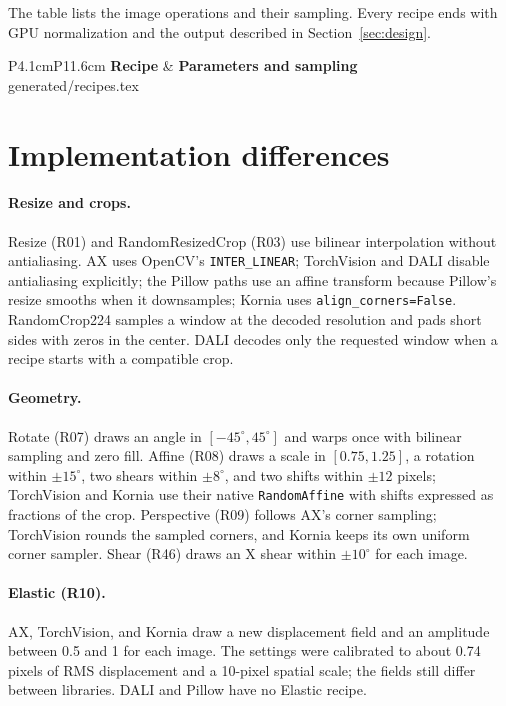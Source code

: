 \documentclass[11pt]{article}
\makeatletter
\let\inputrows\@@input
\makeatother
\begin{document}
The table lists the image operations and their sampling. Every recipe ends with GPU normalization
and the output described in Section~\ref{sec:design}.

\begingroup\small
{}
\begin{longtable}{P{4.1cm}P{11.6cm}}
\textbf{Recipe} & \textbf{Parameters and sampling} \\ \midrule\endhead
\inputrows generated/recipes.tex
\bottomrule
\end{longtable}
\endgroup

\section{Implementation differences}
\label{app:semantics}

\paragraph{Resize and crops.} Resize (R01) and RandomResizedCrop (R03) use bilinear interpolation
without antialiasing. AX uses OpenCV's \texttt{INTER\_LINEAR}; TorchVision and DALI disable
antialiasing explicitly; the Pillow paths use an affine transform because Pillow's resize
smooths when it downsamples; Kornia uses \texttt{align\_corners=False}. RandomCrop224 samples a
window at the decoded resolution and pads short sides with zeros in the center. DALI decodes only
the requested window when a recipe starts with a compatible crop.

\paragraph{Geometry.} Rotate (R07) draws an angle in \([-45^\circ, 45^\circ]\) and warps once
with bilinear sampling and zero fill. Affine (R08) draws a scale in \([0.75, 1.25]\), a rotation
within \(\pm15^\circ\), two shears within \(\pm8^\circ\), and two shifts within \(\pm12\) pixels;
TorchVision and Kornia use their native \texttt{RandomAffine} with shifts expressed as fractions
of the crop. Perspective (R09) follows AX's corner sampling; TorchVision rounds the sampled
corners, and Kornia keeps its own uniform corner sampler. Shear (R46) draws an X shear within
\(\pm10^\circ\) for each image.

\paragraph{Elastic (R10).} AX, TorchVision, and Kornia draw a new displacement field and an
amplitude between 0.5 and 1 for each image. The settings were calibrated to about 0.74 pixels of
RMS displacement and a 10-pixel spatial scale; the fields still differ between libraries. DALI and
Pillow have no Elastic recipe.
\end{document}
